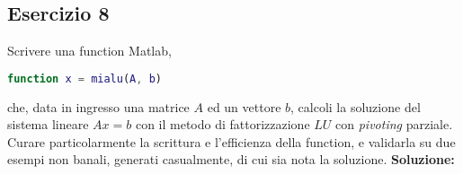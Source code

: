 \subsection{Esercizio 8}
Scrivere una function Matlab,
\begin{lstlisting}[language=Matlab]
    function x = mialu(A, b)
\end{lstlisting}
che, data in ingresso una matrice $A$ ed un vettore $b$, calcoli la soluzione
del sistema lineare $Ax = b$ con il metodo di fattorizzazione $LU$ con \textit{pivoting} parziale.
Curare particolarmente la scrittura e l'efficienza della function,
e validarla su due esempi non banali, generati casualmente,
di cui sia nota la soluzione.
\newline \textbf{Soluzione:}
